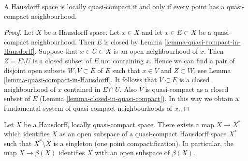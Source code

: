 \begin{lemma}
\label{lemma-locally-quasi-compact-Hausdorff}
A Hausdorff space is locally quasi-compact if and only if every point
has a quasi-compact neighbourhood.
\end{lemma}

\begin{proof}
Let $X$ be a Hausdorff space. Let $x \in X$ and let $x \in E \subset X$
be a quasi-compact neighbourhood. Then $E$ is closed by
Lemma \ref{lemma-quasi-compact-in-Hausdorff}.
Suppose that $x \in U \subset X$ is an open neighbourhood of $x$.
Then $Z = E \setminus U$ is a closed subset of $E$ not containing $x$.
Hence we can find a pair of disjoint open subsets $W, V \subset E$
of $E$ such that $x \in V$ and $Z \subset W$, see
Lemma \ref{lemma-quasi-compact-in-Hausdorff}.
It follows that $\overline{V} \subset E$ is a closed neighbourhood
of $x$ contained in $E \cap U$. Also $\overline{V}$ is quasi-compact
as a closed subset of $E$ (Lemma \ref{lemma-closed-in-quasi-compact}).
In this way we obtain a fundamental system of quasi-compact neighbourhoods
of $x$.
\end{proof}

\begin{lemma}
\label{lemma-one-point-compactification}
Let $X$ be a Hausdorff, locally quasi-compact space.
There exists a map $X \to X^*$ which identifies $X$ as an open
subspace of a quasi-compact Hausdorff space $X^*$ such that
$X^* \setminus X$ is a singleton (one point compactification).
In particular, the map $X \to \beta(X)$ identifies $X$
with an open subspace of $\beta(X)$.
\end{lemma}

